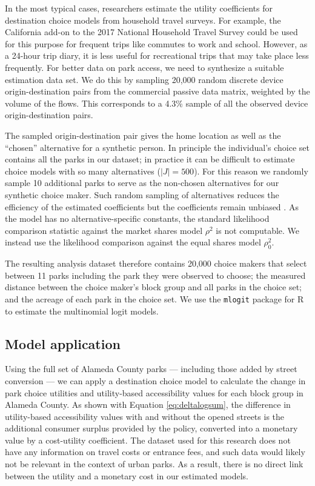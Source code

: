 \documentclass[3p, authoryear, review]{elsarticle} %
\begin{document}
In the most typical cases, researchers estimate the utility coefficients for
destination choice models from household travel surveys. For example, the
California add-on to the 2017 National Household Travel Survey could be used for
this purpose for frequent trips like commutes to work and school. However, as a
24-hour trip diary, it is less useful for recreational trips that may take place
less frequently. For better data on park access, we need to synthesize a
suitable estimation data set. We do this by sampling 20,000 random discrete
device origin-destination pairs from the commercial passive data matrix,
weighted by the volume of the flows. This corresponds to a
4.3\% sample of all the observed device
origin-destination pairs.

The sampled origin-destination pair gives the home location as well as the
``chosen'' alternative for a synthetic person. In principle the individual's
choice set contains all the parks in our dataset; in practice it can be
difficult to estimate choice models with so many alternatives (\(|J| = 500\)).
For this reason we randomly sample 10 additional parks
to serve as the non-chosen alternatives for our synthetic choice maker. Such
random sampling of alternatives reduces the efficiency of the estimated
coefficients but the coefficients remain unbiased \citep{train2009}. As the model has
no alternative-specific constants, the standard likelihood comparison statistic
against the market shares model \(\rho^2\) is not computable. We instead use the
likelihood comparison against the equal shares model \(\rho_0^2\).

The resulting analysis dataset therefore contains 20,000 choice makers that
select between 11 parks including the park they were observed to
choose; the measured distance between the choice maker's block group and all
parks in the choice set; and the acreage of each park in the choice set. We use
the \texttt{mlogit} package for R \citep{mlogit, R} to estimate the multinomial logit
models.

\hypertarget{model-application}{%
\subsection{Model application}\label{model-application}}

Using the full set of Alameda County parks --- including those added by street
conversion --- we can apply a destination choice model to calculate the change in
park choice utilities and utility-based accessibility values for each block
group in Alameda County. As shown with Equation \eqref{eq:deltalogsum}, the
difference in utility-based accessibility values with and without the opened
streets is the additional consumer surplus provided by the policy, converted into a
monetary value by a cost-utility coefficient. The dataset used for this research
does not have any information on travel costs or entrance fees, and such data
would likely not be relevant in the context of urban parks. As a result, there
is no direct link between the utility and a monetary cost in our estimated
models.
\end{document}
